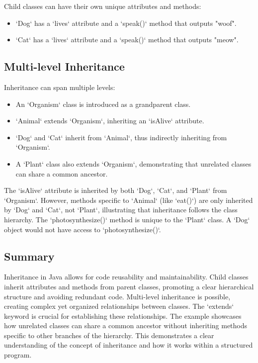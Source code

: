 \documentclass{article}
\begin{document}
Child classes can have their own unique attributes and methods:

\begin{itemize}
    \item `Dog` has a `lives` attribute and a `speak()` method that outputs "woof".
    \item `Cat` has a `lives` attribute and a `speak()` method that outputs "meow".
\end{itemize}


\subsection{Multi-level Inheritance}

Inheritance can span multiple levels:

\begin{itemize}
    \item An `Organism` class is introduced as a grandparent class.
    \item `Animal` extends `Organism`, inheriting an `isAlive` attribute.
    \item `Dog` and `Cat` inherit from `Animal`, thus indirectly inheriting from `Organism`.
    \item A `Plant` class also extends `Organism`, demonstrating that unrelated classes can share a common ancestor.
\end{itemize}

The `isAlive` attribute is inherited by both `Dog`, `Cat`, and `Plant` from `Organism`.  However, methods specific to `Animal` (like `eat()`) are only inherited by `Dog` and `Cat`, not `Plant`, illustrating that inheritance follows the class hierarchy.  The `photosynthesize()` method is unique to the `Plant` class.  A `Dog` object would not have access to `photosynthesize()`.

\subsection{Summary}

Inheritance in Java allows for code reusability and maintainability.  Child classes inherit attributes and methods from parent classes, promoting a clear hierarchical structure and avoiding redundant code.  Multi-level inheritance is possible, creating complex yet organized relationships between classes.  The `extends` keyword is crucial for establishing these relationships.  The example showcases how unrelated classes can share a common ancestor without inheriting methods specific to other branches of the hierarchy.  This demonstrates a clear understanding of the concept of inheritance and how it works within a structured program.
\end{document}
